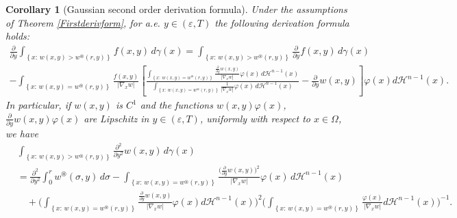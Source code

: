 \documentclass[a4paper,10pt,reqno]{amsart}
\newtheorem{corollary}[theorem]{Corollary}
\numberwithin{equation}{section}
\begin{document}
\begin{corollary}[Gaussian second order derivation formula]\label{Secondderivform}
Under the assumptions of Theorem \ref{Firstderivform}, for a.e. $y\in(\varepsilon,T)$ the following
derivation formula holds:
\begin{multline}
\frac{\partial}{\partial y}\int_{\left\{x:\,w(x,y)>w^{\circledast}(r,y)\right\}}f(x,y)\,d\gamma(x)=
\int_{\left\{x:\,w(x,y)>w^{\circledast}(r,y)\right\}}\frac{\partial}{\partial y}f(x,y)\,d\gamma(x)\\
-\int_{\left\{x:\,w(x,y)=w^{\circledast}(r,y)\right\}}\frac{f(x,y)}{|\nabla_{x}w|}
\left[\frac{{\displaystyle\int_{\left\{x:\,w(x,y)=w^{\circledast}(r,y)\right\}}}
\frac{\frac{\partial}{\partial y}w(x,y)}{|\nabla_{x}w|}\varphi(x)\,d\mathcal{H}^{n-1}(x)}
{{\displaystyle\int_{\left\{x:\,w(x,y)=w^{\circledast}(r,y)\right\}}}\frac{1}{|\nabla_{x}w|}\varphi(x)\,d\mathcal{H}^{n-1}(x)}
-\frac{\partial}{\partial y}w(x,y)\right]\varphi(x)d\mathcal{H}^{n-1}(x).\label{Der1}
\end{multline}
In particular, if $w(x,y)$ is $C^{1}$ and the functions $w(x,y)\varphi(x)$,
$\frac{\partial}{\partial y}w(x,y)\varphi(x)$ are Lipschitz in $y\in(\varepsilon,T)$,
uniformly with respect to $x\in\Omega$, we have
\begin{equation}
\begin{aligned}%
&\int_{\left\{x:\,w(x,y)>w^{\circledast}(r,y)\right\}}\frac{\partial^{2}}{\partial y^{2}}w(x,y)\,d\gamma(x) \\
&=\frac{\partial^{2}}{\partial y^{2}}
\displaystyle\int_{0}^{r}
w^{\circledast}(\sigma,y)\,d\sigma-\int_{\left\{x:\,w(x,y)=w^{\circledast}(r,y)\right\}}
\frac{\big(\frac{\partial}{\partial y}w(x,y)\big)^{2}}{|\nabla_{x}w|}\varphi(x)\,d\mathcal{H}^{n-1}(x)\\
&\quad+\Bigg(\int_{\left\{x:\,w(x,y)=w^{\circledast}(r,y)\right\}}
\frac{\frac{\partial}{\partial y}w(x,y)}{|\nabla_{x}w|}\varphi(x)d\mathcal{H}^{n-1}(x)\Bigg)^{2}
\Bigg(\int_{\left\{x:\,w(x,y)=w^{\circledast}(r,y)\right\}}
\frac{\varphi(x)}{|\nabla_{x}w|}d\mathcal{H}^{n-1}(x)\Bigg)^{-1}.\label{Der2}
\end{aligned}
\end{equation}
\end{corollary}
\end{document}
